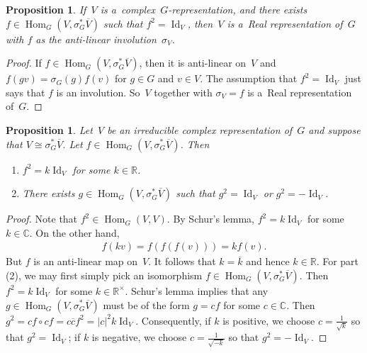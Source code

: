 \documentclass[11pt]{article}
\numberwithin{equation}{section}
\newtheorem{Proposition}[Theorem]{Proposition}
{\theoremstyle{definition}
\newtheorem{Definition}[Theorem]{Definition}
\newtheorem{Example}[Theorem]{Example}
\newtheorem{Remark}[Theorem]{Remark}
}
\DeclareMathOperator{\Hom}{Hom}
\DeclareMathOperator{\Id}{Id}
\begin{document}
\begin{Proposition}
If~$V$ is a~complex~$G$-representation, and there exists $f\in\Hom_G(V,\sigma_G^*\overline{V})$
such that $f^2=\Id_V$, then~$V$ is a~Real representation of~$G$ with $f$ as the anti-linear involution~$\sigma_V$.
\end{Proposition}
\begin{proof}
If $f\in\Hom_G(V,
\sigma_G^*\overline{V})$, then it is anti-linear on~$V$ and $f(gv)=
\sigma_G(g)f(v)$ for $g\in G$ and $v\in V$.
The assumption that $f^2=\Id
_V$ just says that $f$ is an involution.
So~$V$ together with $\sigma_V=f$ is a~Real representation of~$G$.
\end{proof}
\begin{Proposition}
Let~$V$ be an irreducible complex representation of~$G$ and suppose that $V\cong
\sigma_G^*\overline{V}$.
Let $f\in\Hom_G(V,
\sigma_G^*\overline{V})$.
Then
\begin{enumerate}\itemsep=0pt
\item[$1.$]
$f^2=k\Id_V$ for some $k\in\mathbb{R}$.
\item[$2.$]
There exists $g\in\Hom_G(V,
\sigma_G^*\overline{V})$ such that $g^2=\Id_V$ or $g^2=-\Id_V$.
\end{enumerate}
\end{Proposition}
\begin{proof}
Note that $f^2\in\Hom_G(V, V)$.
By Schur's lemma, $f^2=k\Id_V$ for some $k\in\mathbb{C}$.
On the other hand,
\begin{gather*}
f(kv)=f(f(f(v)))=kf(v).
\end{gather*}
But $f$ is an anti-linear map on~$V$.
It follows that $k=\overline{k}$ and hence $k\in\mathbb{R}$.
For part (2), we may f\/irst simply pick an isomorphism $f\in\Hom_G(V,
\sigma_G^*\overline{V})$.
Then $f^2=k\Id_V$ for some $k\in\mathbb{R}^\times$.
Schur's lemma implies that any $g\in\Hom_G(V,
\sigma_G^*\overline{V})$ must be of the form $g=cf$ for some $c\in\mathbb{C}$.
Then $g^2=cf\circ cf=c\overline{c}f^2=|c|^2k\Id_V$.
Consequently, if $k$ is positive, we choose $c=\frac{1}{\sqrt{k}}$ so that $g^2=\Id_V$; if $k$ is negative, we choose $c=\frac{1}{\sqrt{-k}}$ so that $g^2=-\Id_V$.
\end{proof}
\end{document}
